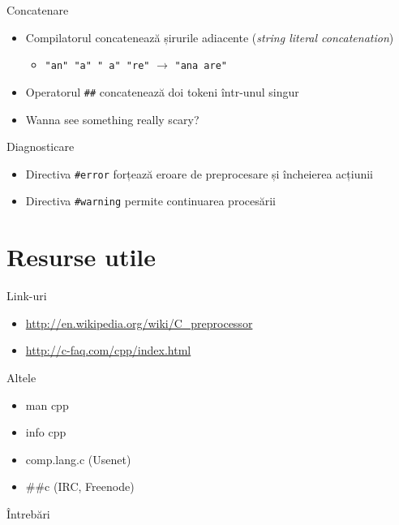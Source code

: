 \documentclass{beamer}
\begin{document}
\begin{frame}{Concatenare}
	\begin{itemize}
		\pause \item Compilatorul concatenează șirurile adiacente
(\textit{string literal concatenation})
			\begin{itemize}
				\item \texttt{"an" "a" " a" "re"} $\rightarrow$
\texttt{"ana are"}
			\end{itemize}
		\pause \item Operatorul \texttt{\#\#} concatenează doi tokeni într-unul
singur
		\pause \item Wanna see something really scary?
	\end{itemize}

	\pause 
\end{frame}

\begin{frame}{Diagnosticare}
	\begin{itemize}
		\pause \item Directiva \texttt{\#error} forțează eroare de preprocesare și
încheierea acțiunii
		\pause \item Directiva \texttt{\#warning} permite continuarea procesării
	\end{itemize}

	\pause 
\end{frame}

\section{Resurse utile}

\frame{\tableofcontents[currentsection]}

\begin{frame}{Link-uri}
	\begin{itemize}
		\item \url{http://en.wikipedia.org/wiki/C\_preprocessor}
		\item \url{http://c-faq.com/cpp/index.html}
	\end{itemize}
\end{frame}

\begin{frame}{Altele}
	\begin{itemize}
		\item man cpp
		\item info cpp
		\item comp.lang.c (Usenet)
		\item \#\#c (IRC, Freenode)
	\end{itemize}
\end{frame}

\begin{frame}{Întrebări}
\end{frame}
\end{document}
